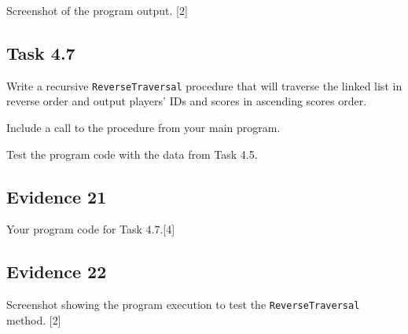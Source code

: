 Screenshot of the program output.\hfill{} {[}2{]}

\subsection*{Task 4.7 }

Write a recursive \texttt{ReverseTraversal} procedure that will traverse
the linked list in reverse order and output players\textquoteright{}
IDs and scores in ascending scores order.

Include a call to the procedure from your main program.

Test the program code with the data from Task 4.5.

\subsection*{Evidence 21 }

Your program code for Task 4.7.\hfill{}{[}4{]}

\subsection*{Evidence 22}

Screenshot showing the program execution to test the \texttt{ReverseTraversal}
method. \hfill{}{[}2{]}